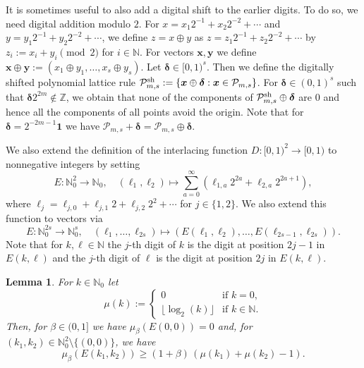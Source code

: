 \documentclass[namedate,webpdf,imanum]{ima-authoring-arxiv}%
\theoremstyle{thmstyletwo}%
\newtheorem{lemma}{Lemma}
\numberwithin{equation}{section}
\newcommand{\bsx}{\boldsymbol{x}}
\newcommand{\bsy}{\boldsymbol{y}}
\newcommand{\bsone}{\boldsymbol{1}}
\newcommand{\bsdelta}{\boldsymbol{\delta}}
\newcommand{\NN}{\mathbb{N}}
\newcommand{\cP}{\mathcal{P}}
\begin{document}
It is sometimes useful to also add a digital shift to the earlier digits. To do so, we need digital addition modulo $2$. For $x = x_1 2^{-1} + x_2 2^{-2} + \cdots$ and $y = y_1 2^{-1} + y_2 2^{-2} + \cdots$, we define $z = x \oplus y$ as $z = z_1 2^{-1} + z_2 2^{-2} + \cdots$ by $z_i := x_i + y_i \pmod{2}$ for $i \in \NN$. For vectors $\bsx, \bsy$ we define $\bsx \oplus \bsy := (x_1 \oplus y_1, \ldots, x_s \oplus y_s)$. Let $\bsdelta \in [0,1)^s$. Then we define the digitally shifted polynomial lattice rule $\cP_{m,s}^{{\rm sh}} := \{\bsx \oplus \bsdelta: \bsx \in \cP_{m,s}\}$. For $\bsdelta \in (0,1)^s$ such that $\bsdelta 2^{2m} \notin \mathbb{Z}$, we obtain that none of the components of $\cP_{m,s}^{{\rm sh}} \oplus \bsdelta$ are $0$ and hence all the components of all points avoid the origin. Note that for $\bsdelta = 2^{-2m-1} \bsone$ we have $\cP_{m,s} + \bsdelta = \cP_{m,s} \oplus \bsdelta$. 

We also extend the definition of the interlacing function $D:[0,1)^2 \rightarrow [0,1)$ to nonnegative integers by setting
\[
E : \mathbb{N}_0^2 \to \mathbb{N}_0, \quad (\ell_1,  \ell_2) \mapsto \sum_{a=0}^{\infty} (\ell_{1,a} 2^{2 a}+\ell_{2,a} 2^{2 a+1}), 
\]
where $\ell_j = \ell_{j,0} + \ell_{j,1} 2 + \ell_{j,2} 2^2 + \cdots$ for $j \in \{1,2\}$. We also extend this function to vectors via
\[
E : \mathbb{N}_0^{2 s} \to \mathbb{N}_0^s, \quad (\ell_1, \dots, \ell_{2 s}) \mapsto \left( E(\ell_1, \ell_2), \dots, E(\ell_{2 s-1}, \ell_{2 s}) \right). 
\]
Note that for $k,\ell \in \NN$ the $j$-th digit of $k$ is the digit at position $2j-1$ in 
$E(k,\ell)$ and the $j$-th digit of $\ell$ is the digit at position $2j$ in $E(k,\ell)$.




\begin{lemma}\label{lem_alpha}
For $k \in \mathbb{N}_0$ let
\begin{equation*}
\mu(k) := \begin{cases} 0 & \mbox{if } k = 0, \\ \lfloor \log_2(k) \rfloor & \mbox{if } k \in \mathbb{N}. \end{cases}
\end{equation*}
Then, for $\beta \in (0,1]$ we have $\mu_{\beta}(E(0,0)) =  0$ and, for $(k_1, k_2) \in \mathbb{N}_0^2 \setminus \{(0, 0)\}$, we have
\begin{equation*}
\mu_{\beta}(E(k_1, k_2)) \ge (1+\beta) \, (\mu(k_1) +  \mu(k_2) - 1).
\end{equation*}
\end{lemma}
\end{document}
